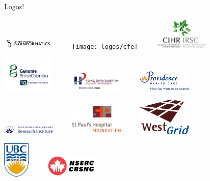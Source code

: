 \documentclass{beamer}
\begin{document}
\begin{frame}{Logos!}
  \vspace{-0.5cm}
  \begin{center}
  \includegraphics[width=1in]{logos/btp}
  $\qquad$
  \texttt{[image: logos/cfe]}
  $\qquad$
  \includegraphics[width=1in]{logos/cihr}

  \includegraphics[width=1in]{logos/genomebc}
  $\qquad$
  \includegraphics[width=1in]{logos/msfhr}
  $\qquad$
  \includegraphics[width=1in]{logos/phc}

  \includegraphics[width=1in]{logos/phcri}
  $\qquad$
  \includegraphics[width=1in]{logos/sphf}
  $\qquad$
  \includegraphics[width=1in]{logos/westgrid}

  \includegraphics[width=0.5in]{logos/ubc}
  $\qquad$
  \includegraphics[width=1in]{logos/nserc}
  \end{center}
\end{frame}
\end{document}
